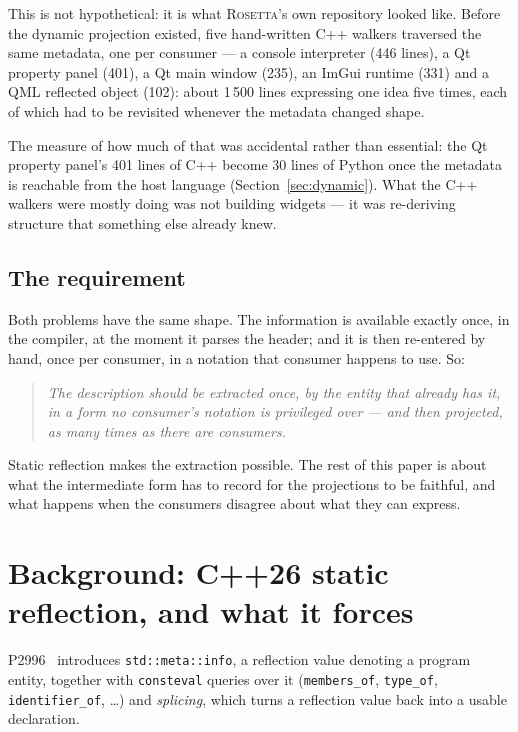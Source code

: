 \documentclass[11pt,a4paper]{article}
\newcommand{\rosetta}{\textsc{Rosetta}}
\newcommand{\code}[1]{\texttt{\small #1}}
\begin{document}
This is not hypothetical: it is what \rosetta's own repository looked like.
Before the dynamic projection existed, five hand-written C++ walkers traversed
the same metadata, one per consumer --- a console interpreter (446 lines), a Qt
property panel (401), a Qt main window (235), an ImGui runtime (331) and a QML
reflected object (102): about 1\,500 lines expressing one idea five times, each
of which had to be revisited whenever the metadata changed shape.

The measure of how much of that was accidental rather than essential: the Qt
property panel's 401 lines of C++ become 30 lines of Python once the metadata is
reachable from the host language (Section~\ref{sec:dynamic}). What the C++ walkers were
mostly doing was not building widgets --- it was re-deriving structure that
something else already knew.

\subsection{The requirement}

Both problems have the same shape. The information is available exactly once,
in the compiler, at the moment it parses the header; and it is then re-entered
by hand, once per consumer, in a notation that consumer happens to use. So:

\begin{quote}\itshape
The description should be extracted once, by the entity that already has it, in
a form no consumer's notation is privileged over --- and then projected, as many
times as there are consumers.
\end{quote}

Static reflection makes the extraction possible. The rest of this paper is about
what the intermediate form has to record for the projections to be faithful, and
what happens when the consumers disagree about what they can express.

\section{Background: C++26 static reflection, and what it forces}
\label{sec:background}

P2996~\cite{p2996} introduces \code{std::meta::info}, a reflection value
denoting a program entity, together with \code{consteval} queries over it
(\code{members\_of}, \code{type\_of}, \code{identifier\_of}, \dots) and
\emph{splicing}, which turns a reflection value back into a usable declaration.
\end{document}
